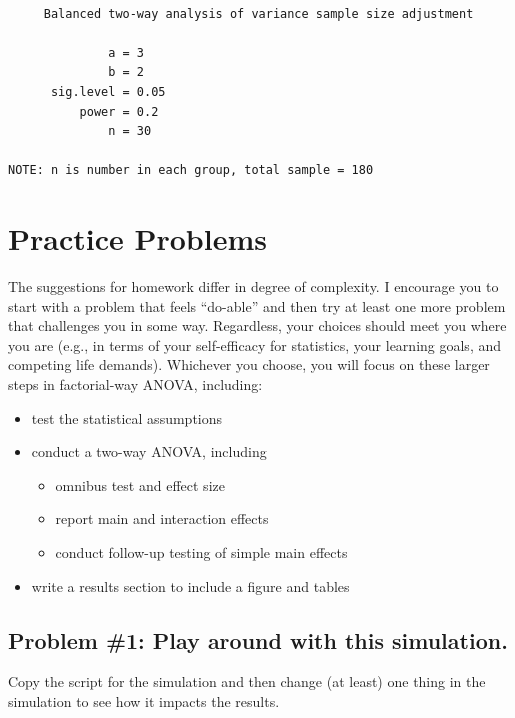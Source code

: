 \documentclass[
  11pt,
]{book}
\providecommand{\tightlist}{%
  \setlength{\itemsep}{0pt}\setlength{\parskip}{0pt}}
\begin{document}
\begin{verbatim}

     Balanced two-way analysis of variance sample size adjustment 

              a = 3
              b = 2
      sig.level = 0.05
          power = 0.2
              n = 30

NOTE: n is number in each group, total sample = 180
\end{verbatim}

\hypertarget{practice-problems-6}{%
\section{Practice Problems}\label{practice-problems-6}}

The suggestions for homework differ in degree of complexity. I encourage you to start with a problem that feels ``do-able'' and then try at least one more problem that challenges you in some way. Regardless, your choices should meet you where you are (e.g., in terms of your self-efficacy for statistics, your learning goals, and competing life demands). Whichever you choose, you will focus on these larger steps in factorial-way ANOVA, including:

\begin{itemize}
\tightlist
\item
  test the statistical assumptions
\item
  conduct a two-way ANOVA, including

  \begin{itemize}
  \tightlist
  \item
    omnibus test and effect size
  \item
    report main and interaction effects
  \item
    conduct follow-up testing of simple main effects
  \end{itemize}
\item
  write a results section to include a figure and tables
\end{itemize}

\hypertarget{problem-1-play-around-with-this-simulation.-1}{%
\subsection{Problem \#1: Play around with this simulation.}\label{problem-1-play-around-with-this-simulation.-1}}

Copy the script for the simulation and then change (at least) one thing in the simulation to see how it impacts the results.
\end{document}
